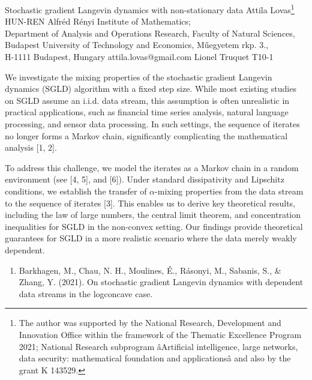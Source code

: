 \begin{talk}
  {Stochastic gradient Langevin dynamics with non-stationary data}%
  {Attila Lovas\footnote{The author was supported by the National Research, Development and Innovation Office within the framework of the Thematic Excellence Program 2021; National Research subprogram âArtificial intelligence, large networks, data security: mathematical foundation and applicationsâ and also by the grant K 143529.}}%
  {HUN-REN Alfr\'ed R\'enyi Institute of Mathematics;\\
  Department of Analysis and Operations Research, Faculty of Natural Sciences,\\
  Budapest University of Technology and Economics, M\H{u}egyetem rkp. 3.,\\ 
  H-1111 Budapest, Hungary}%
  {attila.lovas@gmail.com}%
  {Lionel Truquet}%
  {T10-1}%
		
We investigate the mixing properties of the stochastic gradient Langevin dynamics (SGLD) algorithm with a fixed step size. While most existing studies on SGLD assume an i.i.d. data stream, this assumption is often unrealistic in practical applications, such as financial time series analysis, natural language processing, and sensor data processing. In such settings, the sequence of iterates no longer forms a Markov chain, significantly complicating the mathematical analysis [1, 2].

To address this challenge, we model the iterates as a Markov chain in a random environment (see [4, 5], and [6]). Under standard dissipativity and Lipschitz conditions, we establish the transfer of $\alpha$-mixing properties from the data stream to the sequence of iterates [3]. This enables us to derive key theoretical results, including the law of large numbers, the central limit theorem, and concentration inequalities for SGLD in the non-convex setting. Our findings provide theoretical guarantees for SGLD in a more realistic scenario where the data merely weakly dependent.
		
\medskip

\begin{enumerate}
	
	\item[{[1]}] Barkhagen, M., Chau, N. H., Moulines, \'E., R\'asonyi, M., Sabanis, S., \& Zhang, Y. (2021). On stochastic gradient Langevin dynamics with dependent data streams in the logconcave case.
	

\end{enumerate}
\end{talk}

